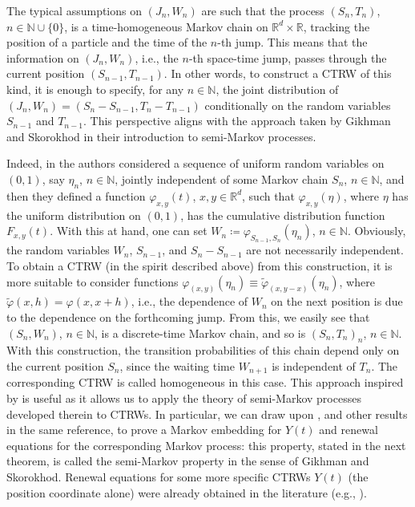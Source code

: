 \documentclass[reqno]{amsart}
\theoremstyle{remark}
\numberwithin{equation}{section} %
\newcommand{\NN}{\mathbb{N}}
\newcommand{\1}{\mathds{1}}
\begin{document}
	The typical assumptions on $(J_n, W_n)$ are such that the process $(S_n, T_n)$, $n \in \mathbb{N}\cup\{0\}$, is a time-homogeneous Markov chain on $\mathbb{R}^d \times \mathbb{R}$, tracking the position of a particle and the time of the $n$-th jump. This means that the information on $(J_n, W_n)$, i.e., the $n$-th space-time jump, passes through the current position $(S_{n-1},T_{n-1})$. In other words, to construct a CTRW of this kind, it is enough to specify, for any $n\in \NN$, the joint distribution of $(J_n,W_n)=(S_n-S_{n-1},T_n-T_{n-1})$ conditionally on the random variables $S_{n-1}$ and $T_{n-1}$. This perspective aligns with the approach taken by Gikhman and Skorokhod \cite[Chapter 3, Section 3]{Gihman} in their introduction to semi-Markov processes.
	
	Indeed, in \cite[Chapter 3, Section 3]{Gihman} the authors considered a sequence of uniform random variables on $(0,1)$, say $\eta_n$, $n \in \mathbb{N}$, jointly independent of some Markov chain $S_n$, $n \in \mathbb{N}$, and then they defined a function $\varphi_{x,y}(t)$, $x,y \in \mathbb{R}^d$, such that $\varphi_{x,y}(\eta)$, where $\eta$ has the uniform distribution on $(0,1)$, has the cumulative distribution function $F_{x,y}(t)$. With this at hand, one can set $W_n \coloneqq \varphi_{S_{n-1}, S_n}(\eta_n)$, $n \in \mathbb{N}$. Obviously, the random variables $W_n$, $S_{n-1}$, and $S_n-S_{n-1}$ are not necessarily independent. To obtain a CTRW (in the spirit described above) from this construction, it is more suitable to consider functions $\varphi_{(x,y)}(\eta_n) \equiv \widetilde\varphi_{(x,y-x)}(\eta_n)$, where $\widetilde\varphi(x,h)=\varphi(x,x+h)$, i.e., the dependence of $W_n$ on the next position is due to the dependence on the forthcoming jump. From this, we easily see that $(S_n, W_n)$, $n \in \mathbb{N}$, is a discrete-time Markov chain, and so is $(S_n,T_n)_n$, $n\in \NN$. With this construction, the transition probabilities of this chain depend only on the current position $S_n$, since the waiting time $W_{n+1}$ is independent of $T_n$. The corresponding CTRW is called homogeneous in this case. This approach inspired by \cite{Gihman} is useful as it allows us to apply the theory of semi-Markov processes developed therein to CTRWs. In particular, we can draw upon \cite[Lemma 2, Section 3, Chapter 3]{Gihman}, and other results in the same reference, to prove a Markov embedding for $Y(t)$ and renewal equations for the corresponding Markov process: this property, stated in the next theorem, is called the semi-Markov property in the sense of Gikhman and Skorokhod. Renewal equations for some more specific CTRWs $Y(t)$ (the position coordinate alone) were already obtained in the literature (e.g., \cite{germano2009stochastic}).
	
\end{document}

